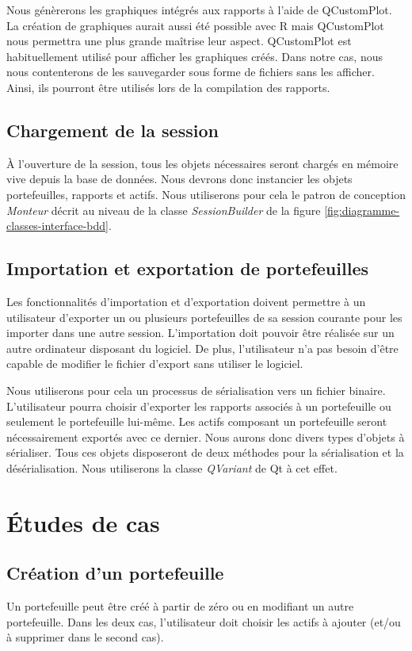 \documentclass[a4paper,titlepage,french]{report}
\begin{document}
Nous génèrerons les graphiques intégrés aux rapports à l'aide de QCustomPlot.
La création de graphiques aurait aussi été possible avec R mais QCustomPlot nous permettra une plus grande maîtrise leur aspect.
QCustomPlot est habituellement utilisé pour afficher les graphiques créés.
Dans notre cas, nous nous contenterons de les sauvegarder sous forme de fichiers sans les afficher.
Ainsi, ils pourront être utilisés lors de la compilation des rapports.


\subsection{Chargement de la session}

\`A l'ouverture de la session, tous les objets nécessaires seront chargés en mémoire vive depuis la base de données.
Nous devrons donc instancier les objets portefeuilles, rapports et actifs.
Nous utiliserons pour cela le patron de conception \textit{Monteur} décrit au niveau de la classe \textit{SessionBuilder} de la figure \ref{fig:diagramme-classes-interface-bdd}.


\subsection{Importation et exportation de portefeuilles}

Les fonctionnalités d'importation et d'exportation doivent permettre à un utilisateur d'exporter un ou plusieurs portefeuilles de sa session courante pour les importer dans une autre session.
L'importation doit pouvoir être réalisée sur un autre ordinateur disposant du logiciel.
De plus, l'utilisateur n'a pas besoin d'être capable de modifier le fichier d'export sans utiliser le logiciel.

Nous utiliserons pour cela un processus de sérialisation vers un fichier binaire.
L'utilisateur pourra choisir d'exporter les rapports associés à un portefeuille ou seulement le portefeuille lui-même.
Les actifs composant un portefeuille seront nécessairement exportés avec ce dernier.
Nous aurons donc divers types d'objets à sérialiser.
Tous ces objets disposeront de deux méthodes pour la sérialisation et la désérialisation.
Nous utiliserons la classe \textit{QVariant} de Qt à cet effet.


\section{\'Etudes de cas}

\subsection{Création d'un portefeuille}
Un portefeuille peut être créé à partir de zéro ou en modifiant un autre portefeuille.
Dans les deux cas, l'utilisateur doit choisir les actifs à ajouter (et/ou à supprimer dans le second cas).
\end{document}
